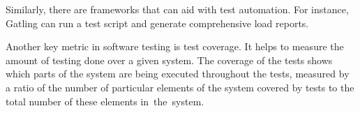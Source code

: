Similarly, there are frameworks that can aid with test automation. For instance, Gatling \cite{gatling} can run a test script and generate comprehensive load reports.


Another key metric in software testing is test coverage. It helps to measure the amount of testing done over a given system. The coverage of the tests shows which parts of the system are being executed throughout the tests, measured by a ratio of the number of particular elements of the system covered by tests to the total number of these elements in~the~system. %








